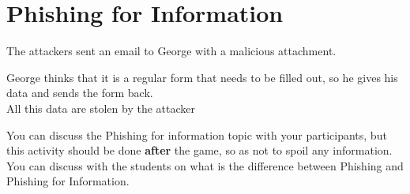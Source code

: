 \section{Phishing for Information}

The attackers sent an email to George with a malicious attachment.

George thinks that it is a regular form that needs to be filled out, so he gives his data and sends the form back. \\
All this data are stolen by the attacker

\begin{hint}
    You can discuss the Phishing for information topic with your participants, but this activity should be done \textbf{after} the game, so as not to spoil any information.
   You can discuss with the students on what is the difference between Phishing and Phishing for Information.
\end{hint}
